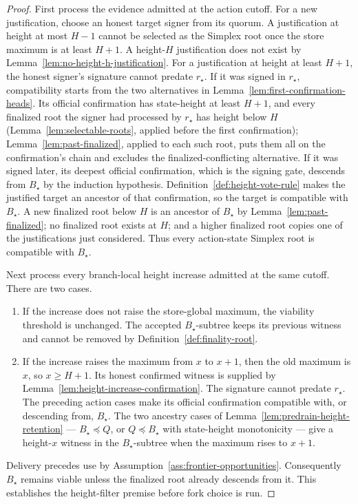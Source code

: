 \begin{proof}
First process the evidence admitted at the action cutoff.  For a new
justification, choose an honest target signer from its quorum.  A
justification at height at most \(H-1\) cannot be selected as the Simplex
root once the store maximum is at least \(H+1\).  A height-\(H\)
justification does not exist by Lemma~\ref{lem:no-height-h-justification}.  For a
justification at height at least \(H+1\), the honest signer's signature
cannot predate \(r_\star\).  If it was signed in \(r_\star\), compatibility
starts from the two alternatives in
Lemma~\ref{lem:first-confirmation-heads}.  Its official confirmation has
state-height at least \(H+1\), and every finalized root the signer
had processed by \(r_\star\) has height below \(H\)
(Lemma~\ref{lem:selectable-roots}, applied before the first
confirmation); Lemma~\ref{lem:past-finalized}, applied to each such
root, puts them all on the confirmation's chain and excludes the
finalized-conflicting alternative.  If it was signed later,
its deepest official confirmation, which is the signing gate, descends from
\(B_\star\) by the induction hypothesis.  Definition~\ref{def:height-vote-rule} makes the justified target
an ancestor of that confirmation, so the target is compatible with
\(B_\star\).  A new finalized root below \(H\) is an ancestor of
\(B_\star\) by Lemma~\ref{lem:past-finalized}; no finalized root exists at
\(H\); and a higher finalized root copies one of the justifications just
considered.  Thus every action-state Simplex root is compatible with
\(B_\star\).

Next process every branch-local height increase admitted at the same cutoff.
There are two cases.
\begin{enumerate}
 \item If the increase does not raise the store-global maximum, the
 viability threshold is unchanged.  The accepted \(B_\star\)-subtree keeps
 its previous witness and cannot be removed by
 Definition~\ref{def:finality-root}.
 \item If the increase raises the maximum from \(x\) to \(x+1\), then the
 old maximum is \(x\), so \(x\geq H+1\).  Its honest confirmed witness is
 supplied by Lemma~\ref{lem:height-increase-confirmation}.  The signature
 cannot predate \(r_\star\).  The preceding action cases make its official
 confirmation compatible with, or descending from, \(B_\star\).  The two
 ancestry cases of Lemma~\ref{lem:predrain-height-retention} ---
 \(B_\star\preceq Q\), or \(Q\preceq B_\star\) with state-height
 monotonicity --- give a height-\(x\) witness in the
 \(B_\star\)-subtree when the maximum rises to \(x+1\).
\end{enumerate}
Delivery precedes use by
Assumption~\ref{ass:frontier-opportunities}.  Consequently
\(B_\star\) remains viable unless the finalized root already descends from
it.  This establishes the height-filter premise before fork choice is run.


\end{proof}

